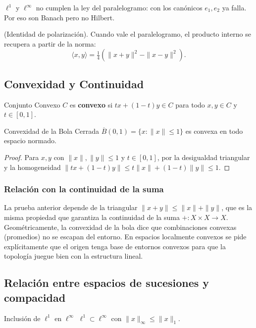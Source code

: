\documentclass[11pt, a4paper]{article}
\begin{document}
\obs $\ell^1$ y $\ell^\infty$ no cumplen la ley del paralelogramo: con los canónicos $e_1, e_2$ ya
falla. Por eso son Banach pero no Hilbert.

\obs (Identidad de polarización). Cuando vale el paralelogramo, el producto interno se recupera a
partir de la norma:
$$ \langle x, y \rangle = \tfrac{1}{4}\left(\|x + y\|^2 - \|x - y\|^2\right). $$

\subsection{Convexidad y Continuidad}

\begin{definicion}{Conjunto Convexo}{}
$C$ es \textbf{convexo} si $tx + (1-t)y \in C$ para todo $x, y \in C$ y $t \in [0,1]$.
\end{definicion}

\begin{proposicion}{Convexidad de la Bola Cerrada}{}
$\overline{B}(0,1) = \{x : \|x\| \le 1\}$ es convexa en todo espacio normado.
\end{proposicion}

\begin{proof}
Para $x, y$ con $\|x\|, \|y\| \le 1$ y $t \in [0,1]$, por la desigualdad triangular y la homogeneidad
$\|tx + (1-t)y\| \le t\|x\| + (1-t)\|y\| \le 1$.
\end{proof}

\subsubsection{Relación con la continuidad de la suma}
La prueba anterior depende de la triangular $\|x+y\| \le \|x\| + \|y\|$, que es la misma propiedad
que garantiza la continuidad de la suma $+: X \times X \to X$. Geométricamente, la convexidad de
la bola dice que combinaciones convexas (promedios) no se escapan del entorno. En espacios
localmente convexos se pide explícitamente que el origen tenga base de entornos convexos para que
la topología juegue bien con la estructura lineal.

\subsection{Relación entre espacios de sucesiones y compacidad}

\begin{proposicion}{Inclusión de $\ell^1$ en $\ell^\infty$}{}
$\ell^1 \subset \ell^\infty$ con $\|x\|_\infty \le \|x\|_1$.
\end{proposicion}
\end{document}
